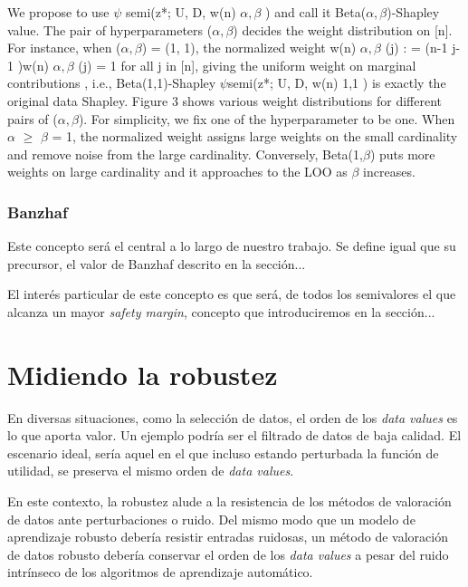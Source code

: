 We propose to use $\psi$ semi(z*; U, D, w(n) $\alpha, \beta$ ) and call it Beta($\alpha, \beta$)-Shapley
value. The pair of hyperparameters ($\alpha, \beta$) decides the weight distribution on [n].
For instance, when ($\alpha, \beta$) = (1, 1), the normalized weight w(n) $\alpha, \beta$ (j) : =
(n-1 j-1 )w(n) $\alpha, \beta$ (j) = 1 for all j in [n], giving the uniform weight on
marginal contributions , i.e., Beta(1,1)-Shapley $\psi$semi(z*; U, D, w(n) 1,1 ) is
exactly the original data Shapley. Figure 3 shows various weight distributions
for different pairs of ($\alpha, \beta$). For simplicity, we fix one of the hyperparameter
to be one. When $\alpha$ \(\geq \) $\beta$ = 1, the normalized weight assigns large weights
on the small cardinality and remove noise from the large cardinality. Conversely,
Beta(1,$\beta$) puts more weights on large cardinality and it approaches to the LOO
as $\beta$ increases.

\subsubsection{Banzhaf}
Este concepto será el central a lo largo de nuestro trabajo.
Se define igual que su precursor, el valor de Banzhaf descrito
en la sección... 

El interés particular de este concepto es que será, de todos
los semivalores el que alcanza un mayor \textit{safety margin},
concepto que introduciremos en la sección...


\newpage
\section{Midiendo la robustez}

En diversas situaciones, como la selección de datos, el orden
de los \textit{data values} es lo que aporta valor\cite{betaShapley}.
Un ejemplo podría ser el filtrado de datos de baja calidad.
El escenario ideal, sería aquel en el que incluso
estando perturbada la función de utilidad, se preserva
el mismo orden de \textit{data values}.

En este contexto, la robustez alude a la resistencia
de los métodos de valoración de datos ante perturbaciones
o ruido. Del mismo modo que un modelo de aprendizaje robusto
debería resistir entradas ruidosas, un método de valoración de
datos robusto debería conservar el orden de los \textit{data values} a pesar
del ruido intrínseco de los algoritmos
de aprendizaje automático.

\

